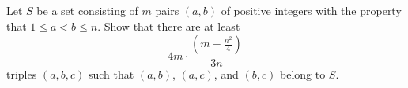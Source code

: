 Let $S$ be a set consisting of $m$ pairs $\left(a,b\right)$ of positive integers with the property that $1\leq a<b\leq n$. Show that there are at least \[4m\cdot\frac{\left(m-\frac{n^2}{4}\right)}{3n}\] triples $\left(a,b,c\right)$ such that $\left(a,b\right)$, $\left(a,c\right)$, and $\left(b,c\right)$ belong to $S$.